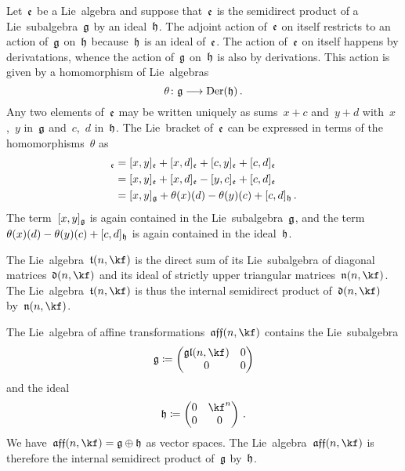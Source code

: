 \begin{fluff}
	\label{calculating structure of internal semidirect product}
	Let~$\mathfrak{e}$ be a Lie~algebra and suppose that~$\mathfrak{e}$ is the semidirect product of a Lie~subalgebra~$\mathfrak{g}$ by an ideal~$\mathfrak{h}$.
	The adjoint action of~$\mathfrak{e}$ on itself restricts to an action of~$\mathfrak{g}$ on~$\mathfrak{h}$ because~$\mathfrak{h}$ is an ideal of~$\mathfrak{e}$.
	The action of~$\mathfrak{e}$ on itself happens by derivatations, whence the action of~$\mathfrak{g}$ on~$\mathfrak{h}$ is also by derivations.
	This action is given by a homomorphism of Lie~algebras
	\[
		\theta
		\colon
		\glie
		\to
		\Der(\hlie) \,.
	\]
	Any two elements of~$\mathfrak{e}$ may be written uniquely as sums~$x + c$ and~$y + d$ with~$x$,~$y$ in~$\mathfrak{g}$ and~$c$,~$d$ in~$\mathfrak{h}$.
	The Lie~bracket of~$\mathfrak{e}$ can be expressed in terms of the homomorphisms~$\theta$ as
	\begin{align*}
		[x + c, y + d]_{\elie}
		&=
		[x, y]_{\elie}
		+ [x, d]_{\elie}
		+ [c, y]_{\elie}
		+ [c, d]_{\elie}
		\\
		&=
		[x, y]_{\elie}
		+ [x, d]_{\elie}
		- [y, c]_{\elie}
		+ [c, d]_{\elie}
		\\
		&=
		[x, y]_{\glie}
		+ \theta(x)(d)
		- \theta(y)(c)
		+ [c, d]_{\hlie} \,.
	\end{align*}
	The term~$[x,y]_{\mathfrak{g}}$ is again contained in the Lie~subalgebra~$\mathfrak{g}$, and the term~$\theta(x)(d) - \theta(y)(c) + [c,d]_{\mathfrak{h}}$ is again contained in the ideal~$\mathfrak{h}$.
\end{fluff}


\begin{example}
	The Lie~algebra~$\trianglie(n, \kf)$ is the direct sum of its Lie~subalgebra of diagonal matrices~$\diaglie(n, \kf)$ and its ideal of strictly upper triangular matrices~$\upperlie(n, \kf)$.
	The Lie~algebra~$\trianglie(n, \kf)$ is thus the internal semidirect product of~$\diaglie(n, \kf)$ by~$\upperlie(n, \kf)$.
\end{example}


\begin{example}
	\label{affine lie algebra is an internal semidirect product}
	The Lie~algebra of affine transformations~$\afflie(n, \kf)$ contains the Lie~subalgebra
	\[
		\glie
		\defined
		\begin{pmatrix}
			\gllie(n, \kf)  & 0 \\
			0               & 0
		\end{pmatrix}
	\]
	and the ideal
	\[
		\hlie
		\defined
		\begin{pmatrix}
			0 & \kf^n \\
			0 & 0
		\end{pmatrix} \,.
	\]
	We have~$\afflie(n, \kf) = \glie \oplus \hlie$ as vector spaces.
	The Lie~algebra~$\afflie(n, \kf)$ is therefore the internal semidirect product of~$\mathfrak{g}$ by~$\mathfrak{h}$.
\end{example}


